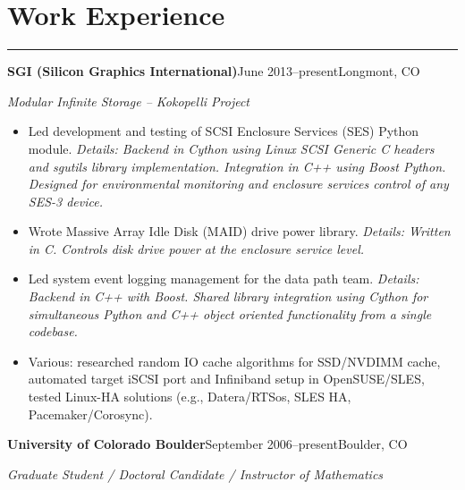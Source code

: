 \documentclass[letterpaper,10pt]{article}
\newcommand{\mblue}{\color{darkblue}}
\begin{document}
\section*{\mblue Work Experience}

\vspace{-2.15pc}
{\hfill\mblue\rule{5.245in}{0.02cm}}

\vspace{1pc}
\textbf{SGI (Silicon Graphics International)}\quad June 2013--present\hfill Longmont, CO

\bigbreak
\textit{Modular Infinite Storage -- Kokopelli Project}

\begin{itemize}
\item Led development and testing of SCSI Enclosure Services (SES) Python module. \textit{Details:
Backend in Cython using Linux SCSI Generic C headers and sgutils library implementation. Integration
in C++ using Boost Python. Designed for environmental monitoring and enclosure services control of
any SES-3 device.}

\item Wrote Massive Array Idle Disk (MAID) drive power library. \textit{Details: Written in C. Controls
disk drive power at the enclosure service level.}

\item Led system event logging management for the data path team. \textit{Details: Backend in C++
with Boost. Shared library integration using Cython for simultaneous Python and C++ object oriented
functionality from a single codebase.}

\item Various: researched random IO cache algorithms for SSD/NVDIMM cache, automated target iSCSI
port and Infiniband setup in OpenSUSE/SLES, tested Linux-HA solutions (e.g., Datera/RTSos, SLES HA,
Pacemaker/Corosync).
\end{itemize}

\vspace{1pc}
\textbf{University of Colorado Boulder}\quad September 2006--present\hfill Boulder, CO

\bigbreak
\textit{Graduate Student / Doctoral Candidate / Instructor of Mathematics}
\end{document}
